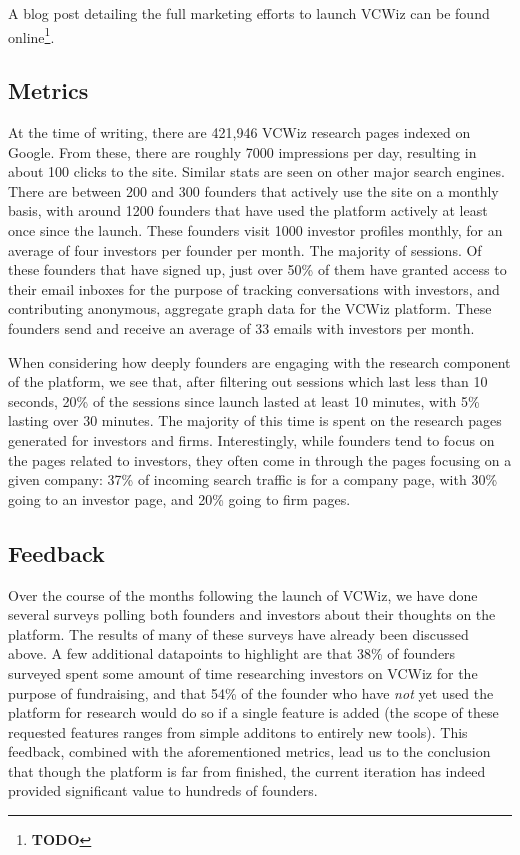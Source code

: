 A blog post detailing the full marketing efforts to launch VCWiz can be found online\footnote{\textbf{TODO}}.

\subsection{Metrics}

At the time of writing, there are 421,946 VCWiz research pages indexed on Google. From these, there are roughly 7000 impressions per day, resulting in about 100 clicks to the site. Similar stats are seen on other major search engines. There are between 200 and 300 founders that actively use the site on a monthly basis, with around 1200 founders that have used the platform actively at least once since the launch. These founders visit 1000 investor profiles monthly, for an average of four investors per founder per month. The majority of sessions. Of these founders that have signed up, just over 50\% of them have granted access to their email inboxes for the purpose of tracking conversations with investors, and contributing anonymous, aggregate graph data for the VCWiz platform. These founders send and receive an average of 33 emails with investors per month.

When considering how deeply founders are engaging with the research component of the platform, we see that, after filtering out sessions which last less than 10 seconds, 20\% of the sessions since launch lasted at least 10 minutes, with 5\% lasting over 30 minutes. The majority of this time is spent on the research pages generated for investors and firms. Interestingly, while founders tend to focus on the pages related to investors, they often come in through the pages focusing on a given company: 37\% of incoming search traffic is for a company page, with 30\% going to an investor page, and 20\% going to firm pages.

\subsection{Feedback}

Over the course of the months following the launch of VCWiz, we have done several surveys polling both founders and investors about their thoughts on the platform. The results of many of these surveys have already been discussed above. A few additional datapoints to highlight are that 38\% of founders surveyed spent some amount of time researching investors on VCWiz for the purpose of fundraising, and that 54\% of the founder who have \textit{not} yet used the platform for research would do so if a single feature is added (the scope of these requested features ranges from simple additons to entirely new tools). This feedback, combined with the aforementioned metrics, lead us to the conclusion that though the platform is far from finished, the current iteration has indeed provided significant value to hundreds of founders.

